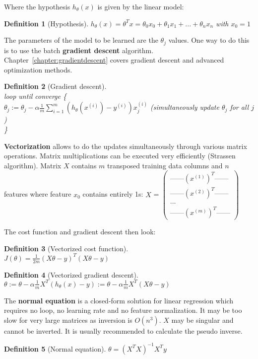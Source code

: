 \documentclass{report}
\newtheorem{definition}{Definition}[section]
\begin{document}
Where the hypothesis $h_\theta(x)$ is given by the linear model:
\begin{definition}[Hypothesis]
$h_\theta(x) = \theta^{T}x = \theta_0 x_0 + \theta_1 x_1 + ... + \theta_n x_n$ with $x_0 = 1$
\end{definition}

The parameters of the model to be learned are the $\theta_j$ values. One way to do this is to use the batch {\bf gradient descent} algorithm.
Chapter~\ref{chapter:gradientdescent} covers gradient descent and advanced optimization methods.

\begin{definition}[Gradient descent] ~\\
loop until converge \{ \\
$\theta_j := \theta_j - \alpha \frac{1}{m}\sum_{i=1}^m(h_\theta(x^{(i)})-y^{(i)})x_j^{(i)}$ (simultaneously update $\theta_j$ for all $j$) \\
\}
\end{definition}

{\bf Vectorization} allows to do the updates simultaneously through various matrix operations. Matrix multiplications can be executed very efficiently (Strassen algorithm). Matrix $X$ contains $m$ transposed training data columns and $n$ features where feature $x_0$ contains entirely 1s:
$X$ = $\begin{pmatrix}
\mbox{------} (x^{(1)})^T \mbox{------} \\
\mbox{------} (x^{(2)})^T \mbox{------} \\
... \\
\mbox{------} (x^{(m)})^T \mbox{------}
\end{pmatrix}$


The cost function and gradient descent then look:

\begin{definition}[Vectorized cost function] ~\\
$J(\theta) = \frac{1}{2m}(X\theta-y)^T(X\theta-y)$\\
\end{definition}

\begin{definition}[Vectorized gradient descent] ~\\
$\theta := \theta - \alpha \frac{1}{m}X^{T}(h_{\theta}(x)-y) := \theta - \alpha \frac{1}{m}X^{T}(X\theta-y)$
\end{definition}

The {\bf normal equation} is a closed-form solution for linear regression which requires no loop, no learning rate and no feature normalization. It may be too slow for very large matrices as inversion is $O(n^3)$. $X$ may be singular and cannot be inverted. It is usually recommended to calculate the pseudo inverse.
\begin{definition}[Normal equation]
$\theta = (X^{T}X)^{-1}X^{T}y$
\end{definition}
\end{document}
